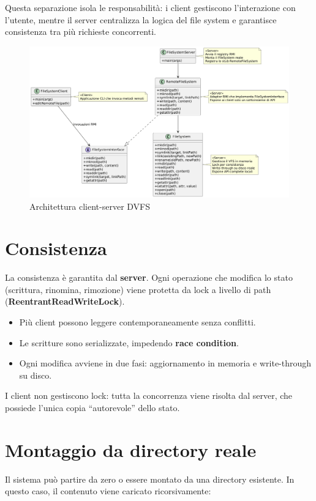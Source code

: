 \documentclass[11pt]{article}
\begin{document}
Questa separazione isola le responsabilità: i client gestiscono l’interazione con l’utente, mentre il server centralizza la logica del file system e garantisce consistenza tra più richieste concorrenti.  

\begin{figure}[htbp]
\centering
\includegraphics[width=.9\linewidth]{img/arch.png}
\caption{Architettura client-server DVFS}
\end{figure}
\section{Consistenza}
\label{sec:org1744541}
La consistenza è garantita dal \textbf{server}.  
Ogni operazione che modifica lo stato (scrittura, rinomina, rimozione) viene protetta da lock a livello di path (\textbf{ReentrantReadWriteLock}).  

\begin{itemize}
\item Più client possono leggere contemporaneamente senza conflitti.
\item Le scritture sono serializzate, impedendo \textbf{race condition}.
\item Ogni modifica avviene in due fasi: aggiornamento in memoria e write-through su disco.
\end{itemize}

I client non gestiscono lock: tutta la concorrenza viene risolta dal server, che possiede l’unica copia “autorevole” dello stato.  
\section{Montaggio da directory reale}
\label{sec:org587691f}
Il sistema può partire da zero o essere montato da una directory esistente.  
In questo caso, il contenuto viene caricato ricorsivamente:  
\end{document}
